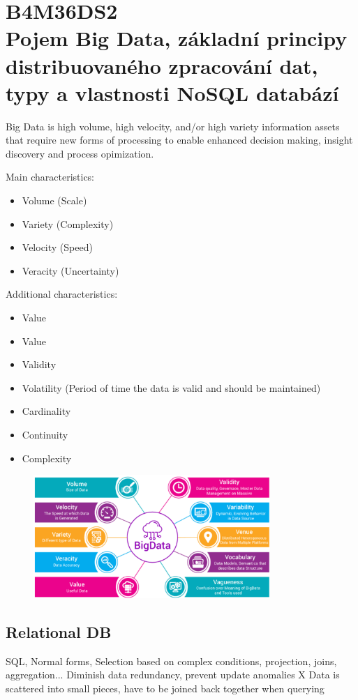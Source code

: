 \chapter[Databáze 2]{B4M36DS2 \\[1ex]\Large{Pojem Big Data, základní principy distribuovaného zpracování dat, typy a vlastnosti NoSQL databází}}
Big Data is high volume, high velocity, and/or high variety information assets that require new forms of processing to enable enhanced decision making, insight discovery and process opimization.

Main characteristics:
\begin{itemize}
    \item Volume (Scale)
    \item Variety (Complexity)
    \item Velocity (Speed)
    \item Veracity (Uncertainty)
\end{itemize}

Additional characteristics:

\begin{itemize}
    \item Value
    \item Value
    \item Validity
    \item Volatility (Period of time the data is valid and should be maintained)
    \item Cardinality
    \item Continuity
    \item Complexity
\end{itemize}


\begin{figure}[ht!]
\centering
\includegraphics[width=0.8\textwidth]{oborove/DS2/img/bigdata.png}
\end{figure}

\section{Relational DB}
SQL, Normal forms, Selection based on complex conditions, projection, joins, aggregation...
Diminish data redundancy, prevent update anomalies X Data is scattered into small pieces, have to be joined back together when querying

